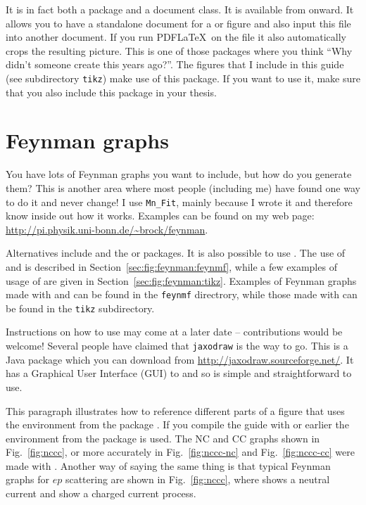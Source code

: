 It is in fact both a package and a document class. It is
available from  onward. It allows you to have a
standalone document for a  or  figure
and also input this file into another document. If you run PDF\LaTeX\
on the file it also automatically crops the resulting picture. This is
one of those packages where you think \enquote{Why didn't someone
  create this years ago?}. The \TikZ figures that I include in this
guide (see subdirectory \texttt{tikz}) make use of this package. If
you want to use it, make sure that you also include this package in
your thesis.


\section{Feynman graphs}
\label{sec:fig:feynman}

You have lots of Feynman graphs you want to include, but how do you
generate them? This is another area where most people (including me)
have found one way to do it and never change! I use \texttt{Mn\_Fit},
mainly because I wrote it and therefore know inside out how it
works. Examples can be found on my web page:
\url{http://pi.physik.uni-bonn.de/~brock/feynman}.

Alternatives include  and the  or
\Package{feynmp} packages.  It is also possible to use
. The use of \Package{feynmf} and  is
described in Section~\ref{sec:fig:feynman:feynmf}, while a few
examples of usage of  are given in
Section~\ref{sec:fig:feynman:tikz}. Examples of Feynman graphs made
with \Package{feynmf} and \Package{feynmp} can be found in the
\texttt{feynmf} directrory, while those made with  can
be found in the \texttt{tikz} subdirectory.

Instructions on how to use  may come at a later
date -- contributions would be welcome! Several people have claimed
that \texttt{jaxodraw} is the way to go. This is a Java package which
you can download from \url{http://jaxodraw.sourceforge.net/}. It has
a Graphical User Interface (GUI) to \Package{axodraw} and so is simple and
straightforward to use.

This paragraph illustrates how to reference different parts of a
figure that uses the environment \Env{subfigure} from the package .
If you compile the guide with \TeXLive 2011 or earlier the
environment  from the package  is used.
The NC and CC graphs shown in
Fig.~\ref{fig:nccc}, or more accurately in Fig.~\ref{fig:nccc-nc} and
Fig.~\ref{fig:nccc-cc} were made with \Package{feynmp}. Another way of
saying the same thing is that typical Feynman graphs for $ep$
scattering are shown in Fig.~\ref{fig:nccc}, where
 shows a neutral current and 
show a charged current process.


